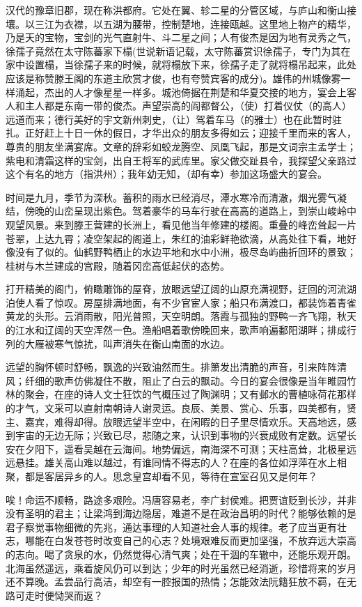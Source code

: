\documentclass[12pt,UTF-8,openany,a4]{ctexbook}
\begin{document}
\begin{large}
    \yiwen 
    汉代的豫章旧郡，现在称洪都府。它处在翼、轸二星的分管区域，与庐山和衡山接壤。以三江为衣襟，以五湖为腰带，控制楚地，连接瓯越。这里地上物产的精华，乃是天的宝物，宝剑的光气直射牛、斗二星之间；人有俊杰是因为地有灵秀之气，徐孺子竟然在太守陈蕃家下榻(世说新语记载，太守陈蕃赏识徐孺子，专门为其在家中设置榻，当徐孺子来的时候，就将榻放下来，徐孺子走了就将榻吊起来，此处应该是称赞滕王阁的东道主欣赏才俊，也有夸赞宾客的成分)。雄伟的州城像雾一样涌起，杰出的人才像星星一样多。城池倚据在荆楚和华夏交接的地方，宴会上客人和主人都是东南一带的俊杰。声望崇高的阎都督公，（使）打着仪仗（的高人）远道而来；德行美好的宇文新州刺史，（让）驾着车马（的雅士）也在此暂时驻扎。正好赶上十日一休的假日，才华出众的朋友多得如云；迎接千里而来的客人，尊贵的朋友坐满宴席。文章的辞彩如蛟龙腾空、凤凰飞起，那是文词宗主孟学士；紫电和清霜这样的宝剑，出自王将军的武库里。家父做交趾县令，我探望父亲路过这个有名的地方（指洪州）；我年幼无知，（却有幸）参加这场盛大的宴会。
    
    时间是九月，季节为深秋。蓄积的雨水已经消尽，潭水寒冷而清澈，烟光雾气凝结，傍晚的山峦呈现出紫色。驾着豪华的马车行驶在高高的道路上，到崇山峻岭中观望风景。来到滕王营建的长洲上，看见他当年修建的楼阁。重叠的峰峦耸起一片苍翠，上达九霄；凌空架起的阁道上，朱红的油彩鲜艳欲滴，从高处往下看，地好像没有了似的。仙鹤野鸭栖止的水边平地和水中小洲，极尽岛屿曲折回环的景致；桂树与木兰建成的宫殿，随着冈峦高低起伏的态势。
    
    打开精美的阁门，俯瞰雕饰的屋脊，放眼远望辽阔的山原充满视野，迂回的河流湖泊使人看了惊叹。房屋排满地面，有不少官宦人家；船只布满渡口，都装饰着青雀黄龙的头形。云消雨散，阳光普照，天空明朗。落霞与孤独的野鸭一齐飞翔，秋天的江水和辽阔的天空浑然一色。渔船唱着歌傍晚回来，歌声响遍鄱阳湖畔；排成行列的大雁被寒气惊扰，叫声消失在衡山南面的水边。
    
    远望的胸怀顿时舒畅，飘逸的兴致油然而生。排箫发出清脆的声音，引来阵阵清风；纤细的歌声仿佛凝住不散，阻止了白云的飘动。今日的宴会很像是当年睢园竹林的聚会，在座的诗人文士狂饮的气概压过了陶渊明；又有邺水的曹植咏荷花那样的才气，文采可以直射南朝诗人谢灵运。良辰、美景、赏心、乐事，四美都有，贤主、嘉宾，难得却得。放眼远望半空中，在闲暇的日子里尽情欢乐。天高地远，感到宇宙的无边无际；兴致已尽，悲随之来，认识到事物的兴衰成败有定数。远望长安在夕阳下，遥看吴越在云海间。地势偏远，南海深不可测；天柱高耸，北极星远远悬挂。雄关高山难以越过，有谁同情不得志的人？在座的各位如浮萍在水上相聚，都是客居异乡的人。思念皇宫却看不见，等待在宣室召见又是何年？
    
    唉！命运不顺畅，路途多艰险。冯唐容易老，李广封侯难。把贾谊贬到长沙，并非没有圣明的君主；让梁鸿到海边隐居，难道不是在政治昌明的时代？能够依赖的是君子察觉事物细微的先兆，通达事理的人知道社会人事的规律。老了应当更有壮志，哪能在白发苍苍时改变自己的心志？处境艰难反而更加坚强，不放弃远大崇高的志向。喝了贪泉的水，仍然觉得心清气爽；处在干涸的车辙中，还能乐观开朗。北海虽然遥远，乘着旋风仍可以到达；少年的时光虽然已经消逝，珍惜将来的岁月还不算晚。孟尝品行高洁，却空有一腔报国的热情；怎能效法阮籍狂放不羁，在无路可走时便恸哭而返？
    

\end{large}
\end{document}

